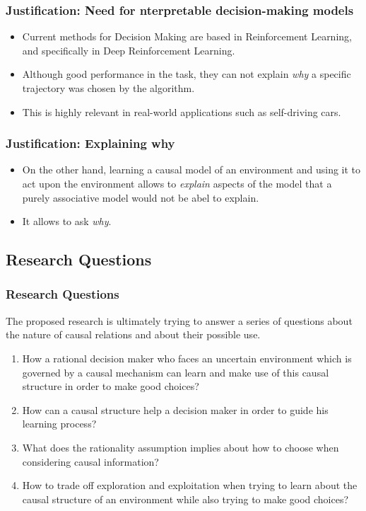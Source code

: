 \documentclass{beamer}
\theoremstyle{plain}
\begin{document}
	\begin{frame}
	\frametitle{Justification: Need for nterpretable decision-making models}
	\begin{itemize}
	\item Current methods for Decision Making are based in Reinforcement Learning, and specifically in Deep Reinforcement Learning. 
	\item Although good performance in the task, they can not explain \textit{why} a specific trajectory was chosen by the algorithm.
	\item This is highly relevant in real-world applications such as self-driving cars.
	\end{itemize}
	\end{frame}
	
	\begin{frame}
	\frametitle{Justification: Explaining why}
	\begin{itemize}
	\item On the other hand, learning a causal model of an environment and using it to act upon the environment allows to \textit{explain} aspects of the model that a purely associative model would not be abel to explain. 
	\item It allows to ask \textit{why}.
	\end{itemize}
	\end{frame}

	\subsection{Research Questions}
	\begin{frame}
	\frametitle{Research Questions}
	The proposed research is ultimately trying to answer a series of questions about the nature of causal relations and about their possible use.
	\begin{enumerate}
	\item How a rational decision maker who faces an uncertain environment which is governed by a causal mechanism can learn and make use of this causal structure in order to make good    	choices? 
	\item How can a causal structure help a decision maker in order to guide his learning process? 
	\item What does the rationality assumption implies about how to choose when considering causal information? 
\item How to trade off exploration and exploitation when trying to learn about the causal structure of an environment while also trying to make good choices?
\end{enumerate}
\end{frame}
\end{document}
